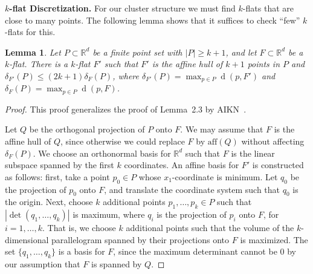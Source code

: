 \documentclass[a4paper,11pt]{paper}
\newcommand{\mathset}[1]{\ensuremath {\mathbb {#1}}}
\newcommand{\R}{\mathset{R}}
\DeclareMathOperator{\dist}{d}
\newtheorem{lemma}[theorem]{Lemma}
\begin{document}
\noindent
\textbf{$k$-flat Discretization.}
For our cluster structure we must find $k$-flats that are
close to many points. The following lemma shows that it
suffices to check ``few'' $k$-flats for this.
\begin{lemma}\label{lem:pert}
  Let $P \subset \R^d$ be a finite point set with $|P| \geq k+1$,
  and let $F \subset \R^d$ be a $k$-flat. There is a $k$-flat $F'$
  such that $F'$ is the affine hull of $k + 1$ points in $P$ and
  $\delta_{F'}(P) \leq (2k + 1) \delta_{F}(P)$,
  where $\delta_{F'}(P) = \max_{p \in P}\dist(p, F')$ and
  $\delta_{F}(P) = \max_{p\in P}\dist(p, F)$.
\end{lemma}
\begin{proof}
  This proof generalizes the proof of Lemma~2.3 by
  AIKN~\cite{AndoniInKrNg09}.

  Let $Q$ be the orthogonal projection of $P$ onto $F$.
  We may assume that $F$ is the affine hull of $Q$, since otherwise
  we could replace $F$ by $\text{aff}(Q)$ without affecting
  $\delta_F(P)$. We choose an orthonormal basis for $\R^d$ such that
  $F$ is the linear subspace spanned by the first $k$ coordinates.
  An affine basis for $F'$ is constructed as follows: first,
  take a point $p_0 \in P$ whose $x_1$-coordinate is minimum. Let
  $q_0$ be the projection of $p_0$ onto $F$, and translate the
  coordinate system such that $q_0$ is the origin.
  Next, choose $k$ additional points $p_1, \dots ,p_{k} \in P$ such
  that $|\det(q_1, \dots, q_k)|$ is maximum, where $q_i$ is
  the projection of $p_i$ onto $F$, for $i = 1, \dots, k$. That is,
  we choose $k$ additional points such that the volume of the
  $k$-dimensional parallelogram spanned by their projections
  onto $F$ is maximized. The set $\{q_1, \dots, q_k\}$ is a basis for
  $F$, since the maximum determinant cannot be $0$ by our assumption
  that $F$ is spanned by $Q$.


\end{proof}
\end{document}
